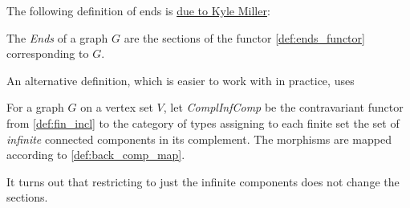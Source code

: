 The following definition of ends is \href{https://leanprover.zulipchat.com/#narrow/stream/116395-maths/topic/Geometric.20group.20theory/near/290624806}{due to Kyle Miller}:

\begin{definition}[Ends]
  \label{def:ends_cat}
  \leanok

  The \emph{Ends} of a graph $G$ are the sections of the functor \ref{def:ends_functor} corresponding to $G$.
\end{definition}

An alternative definition, which is easier to work with in practice, uses
\begin{definition}
  \label{def:inf_ends_functor}
  \leanok

  For a graph $G$ on a vertex set $V$, let \emph{ComplInfComp} be the contravariant functor from \ref{def:fin_incl} to the category of types assigning to each finite set the set of \emph{infinite} connected components in its complement. The morphisms are mapped according to \ref{def:back_comp_map}.
\end{definition}

It turns out that restricting to just the infinite components does not change the sections.

